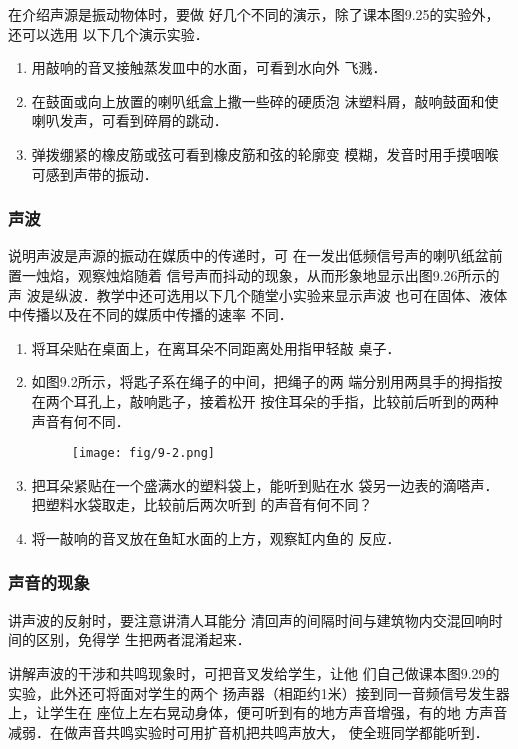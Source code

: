在介绍声源是振动物体时，要做
好几个不同的演示，除了课本图9.25的实验外，还可以选用
以下几个演示实验．
\begin{enumerate}
\item 用敲响的音叉接触蒸发皿中的水面，可看到水向外
飞溅．
\item 在鼓面或向上放置的喇叭纸盒上撒一些碎的硬质泡
沫塑料屑，敲响鼓面和使喇叭发声，可看到碎屑的跳动．
\item 弹拨绷紧的橡皮筋或弦可看到橡皮筋和弦的轮廓变
模糊，发音时用手摸咽喉可感到声带的振动．
\end{enumerate}

\subsubsection{声波}

说明声波是声源的振动在媒质中的传递时，可
在一发出低频信号声的喇叭纸盆前置一烛焰，观察烛焰随着
信号声而抖动的现象，从而形象地显示出图9.26所示的声
波是纵波．教学中还可选用以下几个随堂小实验来显示声波
也可在固体、液体中传播以及在不同的媒质中传播的速率
不同．
\begin{enumerate}
\item 将耳朵贴在桌面上，在离耳朵不同距离处用指甲轻敲
桌子．
\item 如图9.2所示，将匙子系在绳子的中间，把绳子的两
端分别用两具手的拇指按在两个耳孔上，敲响匙子，接着松开
按住耳朵的手指，比较前后听到的两种声音有何不同．
\begin{figure}[htp]
    \centering
\texttt{[image: fig/9-2.png]}
    \caption{}
\end{figure}

\item 把耳朵紧贴在一个盛满水的塑料袋上，能听到贴在水
袋另一边表的滴嗒声．把塑料水袋取走，比较前后两次听到
的声音有何不同？
\item 将一敲响的音叉放在鱼缸水面的上方，观察缸内鱼的
反应．
\end{enumerate}

\subsubsection{声音的现象} 

讲声波的反射时，要注意讲清人耳能分
清回声的间隔时间与建筑物内交混回响时间的区别，免得学
生把两者混淆起来．

讲解声波的干涉和共鸣现象时，可把音叉发给学生，让他
们自己做课本图9.29的实验，此外还可将面对学生的两个
扬声器（相距约1米）接到同一音频信号发生器上，让学生在
座位上左右晃动身体，便可听到有的地方声音增强，有的地
方声音减弱．在做声音共鸣实验时可用扩音机把共鸣声放大，
使全班同学都能听到．


